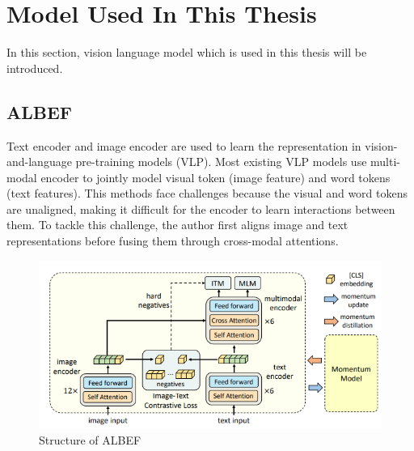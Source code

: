 
\section{Model Used In This Thesis}
In this section, vision language model which is used in this thesis will be introduced.

\subsection{ALBEF}
Text encoder and image encoder are used to learn the representation in vision-and-language pre-training models (VLP). Most existing VLP models use multi-modal encoder to jointly model visual token (image feature) and word tokens (text features). This methods face challenges because the visual and word tokens are unaligned, making it difficult for the encoder to learn interactions between them. 
To tackle this challenge, the author first aligns image and text representations before fusing them through cross-modal attentions. 

\begin{figure}[htbp]
    \begin{center}
        \includegraphics[width=\linewidth]{img/albef_model_structure.png}
        \caption{Structure of ALBEF}
        \label{fig:albef}
    \end{center}
\end{figure}

